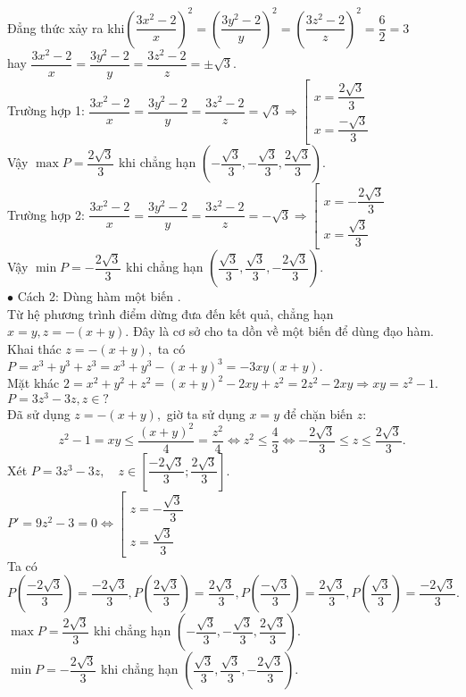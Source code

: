 \begin{bt}
{		Đẳng thức xảy ra khi$ \left(\dfrac{3x^2-2}{x}\right)^2= \left(\dfrac{3y^2-2}{y}\right)^2=  \left(\dfrac{3z^2-2}{z}\right)^2=\dfrac{6}{2}=3$\\
		hay $ \dfrac{3x^2-2}{x}=\dfrac{3y^2-2}{y}= \dfrac{3z^2-2}{z}=\pm\sqrt{3}. $\\
		Trường hợp 1: $\dfrac{3x^2-2}{x}=\dfrac{3y^2-2}{y}=\dfrac{3z^2-2}{z}=\sqrt{3} \Rightarrow 
		\left[ \begin{array}{l}
		x = \dfrac{2\sqrt{3}}{3}\\
		x = \dfrac{-\sqrt{3}}{3}
		\end{array} \right. $\\
		Vậy $\max P=\dfrac{2\sqrt{3}}{3}$ khi chẳng hạn  $\left(-\dfrac{\sqrt{3}}{3} ,-\dfrac{\sqrt{3}}{3} ,\dfrac{2\sqrt{3}}{3}\right). $\\
		Trường hợp 2: $\dfrac{3x^2-2}{x}=\dfrac{3y^2-2}{y}=\dfrac{3z^2-2}{z}=-\sqrt{3} \Rightarrow 
		\left[ \begin{array}{l}
		x = -\dfrac{2\sqrt{3}}{3}\\
		x = \dfrac{\sqrt{3}}{3}
		\end{array} \right. $\\
		Vậy $\min P=-\dfrac{2\sqrt{3}}{3}$ khi chẳng hạn  $\left(\dfrac{\sqrt{3}}{3} ,\dfrac{\sqrt{3}}{3} ,-\dfrac{2\sqrt{3}}{3}\right). $\\
		$\bullet$ Cách 2: Dùng hàm một biến .\\
		Từ hệ phương trình điểm dừng đưa đến kết quả, chẳng hạn $x=y, z=-\left(x+y\right).$ Đây là cơ sở cho ta dồn về một biến để dùng đạo hàm.\\
		Khai thác $ z=-\left(x+y\right), $ ta có $P=x^3+y^3+z^3=x^3+y^3-\left(x+y\right)^3=-3xy \left(x+y\right). $\\
		Mặt khác $2=x^2+y^2+z^2=\left(x+y\right)^2-2xy+z^2=2z^2-2xy\Rightarrow xy=z^2-1. $\\
		$P=3z^3-3z, z\in ?$\\
		Đã sử dụng $ z=- \left(x+y\right),$ giờ ta sử dụng $x=y$ để chặn biến $z:$\\
		$$z^2-1=xy\le \dfrac{\left(x+y\right)^2}{4}=\dfrac{z^2}{4}\Leftrightarrow z^2 \le \dfrac{4}{3} \Leftrightarrow -\dfrac{2\sqrt{3}}{3}\le z \le \dfrac{2\sqrt{3}}{3}.$$
		Xét $P=3z^3-3z,\quad z \in \left[ {\dfrac{{ - 2\sqrt 3 }}{3};\dfrac{{2\sqrt 3 }}{3}} \right]  .$\\
		$P'=9z^2-3=0 \Leftrightarrow \left[ \begin{array}{l}
		z = -\dfrac{\sqrt{3}}{3}\\
		z = \dfrac{\sqrt{3}}{3}
		\end{array} \right. $\\  
		Ta có $P\left(\dfrac{-2\sqrt{3}}{3}\right)=\dfrac{-2\sqrt{3}}{3}, P\left(\dfrac{2\sqrt{3}}{3}\right)=\dfrac{2\sqrt{3}}{3},P\left(\dfrac{-\sqrt{3}}{3}\right)=\dfrac{2\sqrt{3}}{3},P\left(\dfrac{\sqrt{3}}{3}\right)=\dfrac{-2\sqrt{3}}{3}. $\\
		$\max P=\dfrac{2\sqrt{3}}{3}$ khi chẳng hạn $\left(-\dfrac{\sqrt{3}}{3} ,-\dfrac{\sqrt{3}}{3} ,\dfrac{2\sqrt{3}}{3}\right). $\\
		$\min P=-\dfrac{2\sqrt{3}}{3}$ khi chẳng hạn $\left(\dfrac{\sqrt{3}}{3} ,\dfrac{\sqrt{3}}{3} ,-\dfrac{2\sqrt{3}}{3}\right). $\\
	}
\end{bt}
